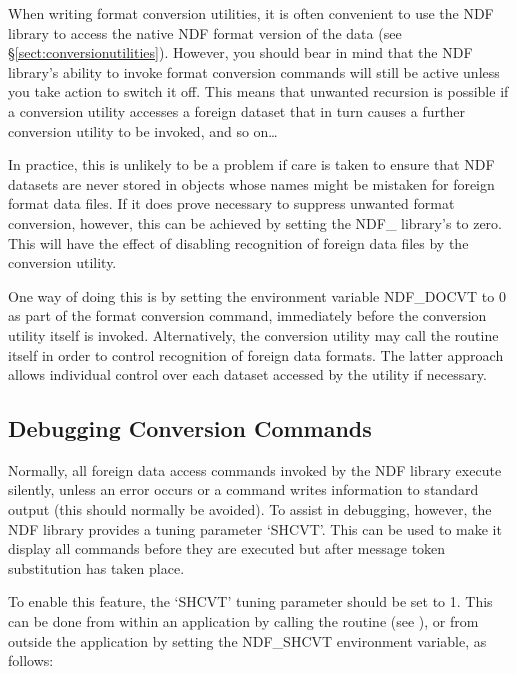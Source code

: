 \documentclass[11pt,twoside,nolof]{starlink}
\begin{document}
When writing format conversion utilities, it is often convenient to
use the NDF library to access the native NDF format version of the
data (see \S\ref{sect:conversionutilities}). However, you should bear
in mind that the NDF library's ability to invoke format conversion
commands will still be active unless you take action to switch it
off. This means that unwanted recursion is possible if a conversion
utility accesses a foreign dataset that in turn causes a further
conversion utility to be invoked, and so on\ldots

In practice, this is unlikely to be a problem if care is taken to
ensure that NDF datasets are never stored in objects whose names might
be mistaken for foreign format data files. If it does prove necessary
to suppress unwanted format conversion, however, this can be achieved
by setting the NDF\_ library's  to zero.  This will have the
effect of disabling recognition of foreign data files by the
conversion utility.

One way of doing this is by setting the environment variable
NDF\_DOCVT to 0 as part of the format conversion command, immediately
before the conversion utility itself is invoked. Alternatively, the
conversion utility may call the 
routine itself in order to control recognition of foreign data
formats. The latter approach allows individual control over each
dataset accessed by the utility if necessary.

\subsection{Debugging Conversion Commands}

Normally, all foreign data access commands invoked by the NDF library
execute silently, unless an error occurs or a command writes
information to standard output (this should normally be avoided). To
assist in debugging, however, the NDF library provides a tuning
parameter `SHCVT'. This can be used to make it display all commands
before they are executed but after message token substitution has
taken place.

To enable this feature, the `SHCVT' tuning parameter should be set to
1. This can be done from within an application by calling the
 routine (see
), or from outside the
application by setting the NDF\_SHCVT environment variable, as
follows:
\end{document}
